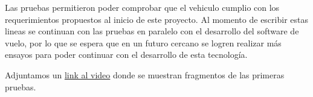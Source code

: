 Las pruebas permitieron poder comprobar que el vehiculo cumplio con los requerimientos propuestos al inicio de este proyecto. Al momento de escribir estas lineas se continuan con las pruebas en paralelo con el desarrollo del software de vuelo, por lo que se espera que en un futuro cercano se logren realizar más ensayos para poder continuar con el desarrollo de esta tecnología.

Adjuntamos un \href{https://youtu.be/0CX27jy0x9w}{link al video} \citep*{pruebasVTVLE2021} donde se muestran fragmentos de las primeras pruebas. 